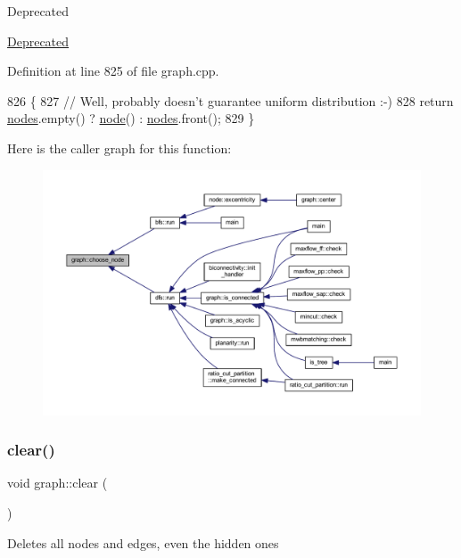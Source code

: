 \begin{DoxyRefDesc}{Deprecated}
\item[\mbox{\hyperlink{deprecated__deprecated000005}{Deprecated}}]\end{DoxyRefDesc}


Definition at line 825 of file graph.\+cpp.


\begin{DoxyCode}
826 \{
827     \textcolor{comment}{// Well, probably doesn't guarantee uniform distribution :-)}
828     \textcolor{keywordflow}{return} \mbox{\hyperlink{classgraph_a4ea0592e8eb7c26c5abad24546907726}{nodes}}.empty() ? \mbox{\hyperlink{classnode}{node}}() : \mbox{\hyperlink{classgraph_a4ea0592e8eb7c26c5abad24546907726}{nodes}}.front();
829 \}
\end{DoxyCode}
Here is the caller graph for this function\+:
\nopagebreak
\begin{figure}[H]
\begin{center}
\leavevmode
\includegraphics[width=350pt]{classgraph_aec5c11c90a94ebd145f059a541db860e_icgraph}
\end{center}
\end{figure}
\mbox{\label{classgraph_a9ff5d6af3653e79f87b836701453f55a}} 
\subsubsection{\texorpdfstring{clear()}{clear()}}
{\footnotesize\ttfamily void graph\+::clear (\begin{DoxyParamCaption}{ }\end{DoxyParamCaption})}

Deletes all nodes and edges, even the hidden ones 

